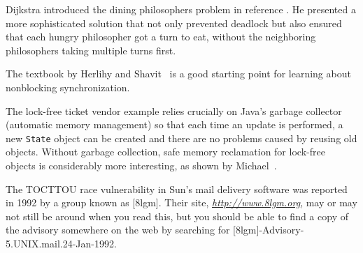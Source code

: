 Dijkstra introduced the dining philosophers problem in reference \cite{max993}.
He presented a more sophisticated solution that not only prevented
deadlock but also ensured that each hungry philosopher got a turn to
eat, without the neighboring philosophers taking multiple turns first.

The textbook by Herlihy and Shavit~\cite{max1202} is a good starting point for learning about nonblocking synchronization.

The lock-free ticket vendor example relies crucially on Java's garbage collector (automatic memory management) so that each time an update is performed, a new \texttt{State} object can be created and there are no problems caused by reusing old objects.  Without garbage collection, safe memory reclamation for lock-free objects is considerably more interesting, as shown by Michael~\cite{max1203}.

The TOCTTOU race vulnerability in Sun's mail delivery software was
reported in 1992 by a group known as [8lgm].  Their site,
\textit{\url{http://www.8lgm.org}}, may or may not still be around when you read
this, but you should be able to find a copy of the advisory somewhere
on the web by searching for [8lgm]-Advisory-5.UNIX.mail.24-Jan-1992.
